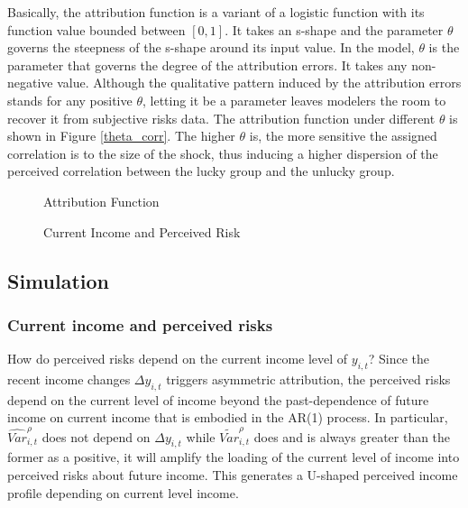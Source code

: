 \documentclass[12pt,notitlepage,onecolumn,aps,pra]{article}
\begin{document}
Basically, the attribution function is a variant of a logistic function
with its function value bounded between \([0,1]\). It takes an s-shape
and the parameter \(\theta\) governs the steepness of the s-shape around
its input value. In the model, \(\theta\) is the parameter that governs
the degree of the attribution errors. It takes any non-negative value.
Although the qualitative pattern induced by the attribution errors
stands for any positive \(\theta\), letting it be a parameter leaves
modelers the room to recover it from subjective risks data. The
attribution function under different \(\theta\) is shown in Figure
\ref{theta_corr}. The higher \(\theta\) is, the more sensitive the
assigned correlation is to the size of the shock, thus inducing a higher
dispersion of the perceived correlation between the lucky group and the
unlucky group.


    \begin{figure*}[!ht]
        \begin{center}\end{center}
        \caption{Attribution Function}
        \label{fig:theta_corr}
    \end{figure*}
    

    \begin{figure*}[!ht]
        \begin{center}\end{center}
        \caption{Current Income and Perceived Risk}
        \label{fig:var_recent}
    \end{figure*}
    
    \hypertarget{simulation}{%
\subsection{Simulation}\label{simulation}}

\hypertarget{current-income-and-perceived-risks}{%
\subsubsection{Current income and perceived
risks}\label{current-income-and-perceived-risks}}

How do perceived risks depend on the current income level of
\(y_{i,t}\)? Since the recent income changes \(\Delta y_{i,t}\) triggers
asymmetric attribution, the perceived risks depend on the current level
of income beyond the past-dependence of future income on current income
that is embodied in the AR(1) process. In particular,
\(\widehat{Var}^\rho_{i,t}\) does not depend on \(\Delta y_{i,t}\) while
\(\tilde{Var}^\rho_{i,t}\) does and is always greater than the former as
a positive, it will amplify the loading of the current level of income
into perceived risks about future income. This generates a U-shaped
perceived income profile depending on current level income.
\end{document}
